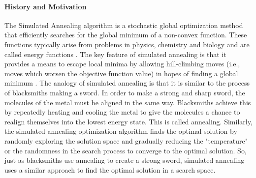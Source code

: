 \paragraph{History and Motivation}
The Simulated Annealing algorithm is a stochastic global optimization method that efficiently searches for the global minimum of a non-convex function. These functions typically arise from problems in physics, chemistry and biology and are called energy functions \cite[1]{XIANG1997216}. The key feature of simulated annealing is that it provides a means to escape local minima by allowing hill-climbing moves (i.e., moves which worsen the objective function value) in hopes of finding a global minimum \cite{Henderson2003}. The analogy of simulated annealing is that it is similar to the process of blacksmiths making a sword. In order to make a strong and sharp sword, the molecules of the metal must be aligned in the same way. Blacksmiths achieve this by repeatedly heating and cooling the metal to give the molecules a chance to realign themselves into the lowest energy state. This is called annealing. Similarly, the simulated annealing optimization algorithm finds the optimal solution by randomly exploring the solution space and gradually reducing the "temperature" or the randomness in the search process to converge to the optimal solution. So, just as blacksmiths use annealing to create a strong sword, simulated annealing uses a similar approach to find the optimal solution in a search space. 
